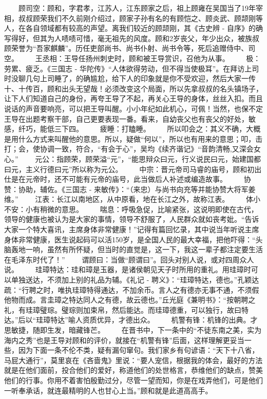 \documentclass[]{book}
\begin{document}
　　顾司空：顾和，字君孝，江苏人，江东顾家之后，祖上顾雍在吴国当了19年宰相，叔叔顾荣我们不久前刚介绍过，顾家子孙有名的有顾恺之、顾炎武、顾颉刚等人，在各自领域都有较高的声望。离我们较近的顾颉刚，其《古史辨
-
自序》的确写得好，但其为人啧啧可惜，毫无祖先的风度。顾和2岁丧父，年少出众，被族叔顾荣誉为``吾家麒麟''。历任吏部尚书、尚书仆射、尚书令等，死后追赠侍中、司空。
　　王丞相：王导任扬州刺史时，顾和被王导赏识，召他为从事。
　　极：劳累、疲乏。《三国志 -
华陀传》``人体欲得劳动，但不得当使极耳''。在拜访上司时没聊几句上司睡了，的确尴尬，给下人的印象就是你不受欢迎，然后大家一传十、十传百，顾和出头无望哉！必须改变这个局面，所以先拿叔叔的名头镇场子，让下人们知道自己的身份，再夸王导了不起，再关心王导的身体，丝丝入扣。而且说话的声音要响亮，可以把王导叫醒。小小年纪如此机心，可佩！当然，也保不定王导在出题考察干部，自己更要表现一番。看来，自幼丧父也有丧父的好处，敏感，纤巧，能低三下四。
　　疲睡：打瞌睡。
　　所以叩会之：其义不确，大概是用什么方式来叫醒他的意思。所以，疑做``何以''，所以也有用来的意思；叩，击打；会，使协调一致，符合，``有会于心''，吴均《续齐谐记》``音韵清畅,又深会女心。''
　　元公：指顾荣，顾荣溢``元''，``能思辩众曰元，行义说民曰元，始建国都曰元，主义行德曰元''所以称为元公。
　　中宗：晋元帝司马睿的庙号，顾和初出仕是在元帝时，还不可能有元帝的庙号，此当做后人补述或编造故事。
　　协赞：协助，辅佐。《三国志 -
来敏传》：``（来忠）与尚书向充等并能协赞大将军姜维。''
　　江表：长江以南地区，从中原看，地在长江之外，故称江表。
　　体小不安：小有稍微的意思。
　　喘息：呼吸急促，比喻紧张，这说明即使在古代，领导的健康也被认为是大家的事情，领导不舒服了，人民群众就如丧考妣。``告诉大家一个特大喜讯，主席身体非常健康！''记得有篇回忆录，其中说当年听说主席身体非常健康，医生说起码可以活150岁，是全国人民的最大幸福，把他吓得：``头脑轰地一响，虽然有所怀疑，但当时的直觉是，这一下，我这一辈子都注定要生活在毛泽东时代了！''
　　谓顾曰：当做``顾谓曰''。回头对别人说，或对四周众人说。
　　珪璋特达：珪和璋是玉器，是诸侯朝见天子时所用的重礼。用珪璋时可以单独送达，不须加上别的礼品为辅。《礼记
-
聘义》：``珪璋特达，德也。''孔颖达疏：``行聘之时，唯执珪璋特得通达，不加余币。言人之有德亦无事不通，不须假他物而成。言圭璋之特达同人之有德，故云德也。''丘光庭《兼明书》：``按朝聘之礼，有珪璋璧琮。璧琮则加束帛，然后能达。而珪璋德重，可以独行，故曰特达。''后以``珪璋特达''喻人资质优异，才德出众。
　　机警有锋：机锋的出典。才思敏捷，随即生发，暗藏锋芒。
　　在晋书中，下一条中的``不徒东南之美，实为海内之秀''也是王导对顾和的评价，就接在``机警有锋''后面，这样理解更妥当一些，因为下面一条不伦不类，疑有漏句窜句。我们家乡有句谚语：``天下十八省，马屁大通行''，莫里哀在《吝啬鬼》里说：``要人宠信，根据我的体会，最好的方法就是在他们面前，投合他们的爱好，称道他们的处世格言，恭维他们的缺点，赞美他们的行事。你用不着害怕殷勤过分，尽管一望而知，你是在戏弄他们，可是他们一听奉承话，就连最精明的人也甘心上当。''顾和就是此道高高手。
\end{document}
